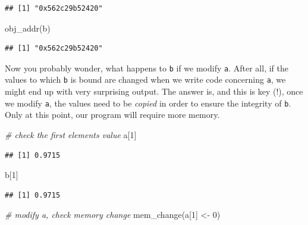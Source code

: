 \documentclass[
  12pt,
]{style/krantz}
\newenvironment{Shaded}{\begin{snugshade}}{\end{snugshade}}
\newcommand{\CommentTok}[1]{\textcolor[rgb]{0.56,0.35,0.01}{\textit{#1}}}
\newcommand{\DecValTok}[1]{\textcolor[rgb]{0.00,0.00,0.81}{#1}}
\newcommand{\FunctionTok}[1]{\textcolor[rgb]{0.00,0.00,0.00}{#1}}
\newcommand{\NormalTok}[1]{#1}
\newcommand{\OtherTok}[1]{\textcolor[rgb]{0.56,0.35,0.01}{#1}}
\begin{document}
\begin{verbatim}
## [1] "0x562c29b52420"
\end{verbatim}

\begin{Shaded}
\begin{Highlighting}[]
\FunctionTok{obj\_addr}\NormalTok{(b)}
\end{Highlighting}
\end{Shaded}

\begin{verbatim}
## [1] "0x562c29b52420"
\end{verbatim}

Now you probably wonder, what happens to \texttt{b} if we modify \texttt{a}. After all, if the values to which \texttt{b} is bound are changed when we write code concerning \texttt{a}, we might end up with very surprising output. The answer is, and this is key (!), once we modify \texttt{a}, the values need to be \emph{copied} in order to ensure the integrity of \texttt{b}. Only at this point, our program will require more memory.

\begin{Shaded}
\begin{Highlighting}[]
\CommentTok{\# check the first element\textquotesingle{}s value}
\NormalTok{a[}\DecValTok{1}\NormalTok{]}
\end{Highlighting}
\end{Shaded}

\begin{verbatim}
## [1] 0.9715
\end{verbatim}

\begin{Shaded}
\begin{Highlighting}[]
\NormalTok{b[}\DecValTok{1}\NormalTok{]}
\end{Highlighting}
\end{Shaded}

\begin{verbatim}
## [1] 0.9715
\end{verbatim}

\begin{Shaded}
\begin{Highlighting}[]
\CommentTok{\# modify a, check memory change}
\FunctionTok{mem\_change}\NormalTok{(a[}\DecValTok{1}\NormalTok{] }\OtherTok{\textless{}{-}} \DecValTok{0}\NormalTok{)}
\end{Highlighting}
\end{Shaded}
\end{document}
